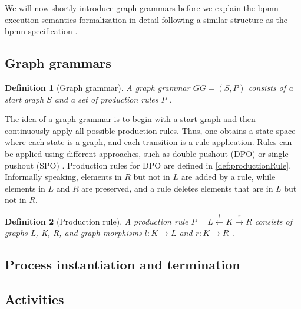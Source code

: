 \documentclass[adraft, copyright, creativecommons]{eptcs} %
\newtheorem{definition}{Definition}
\begin{document}
We will now shortly introduce graph grammars before we explain the \gls*{bpmn} execution semantics formalization in detail following a similar structure as the \gls*{bpmn} specification \cite[Chapter 13]{objectmanagementgroupBusinessProcessModel2013}.

\subsection{Graph grammars}

\begin{definition}[Graph grammar] \label{def:graphGrammar}
A graph grammar $GG=(S, P)$ consists of a start graph $S$ and a set of production rules $P$ \cite{ehrigFundamentalsAlgebraicGraph2006}. 
\end{definition}

The idea of a graph grammar is to begin with a start graph and then continuously apply all possible production rules.
Thus, one obtains a state space where each state is a graph, and each transition is a rule application.
Rules can be applied using different approaches, such as double-pushout (DPO) \cite{ehrigFundamentalsAlgebraicGraph2006} or single-pushout (SPO) \cite{loweAlgebraicApproachSinglepushout1993}.
Production rules for DPO are defined in \autoref{def:productionRule}.
Informally speaking, elements in $R$ but not in $L$ are added by a rule, while elements in $L$ and $R$ are preserved, and a rule deletes elements that are in $L$ but not in $R$.

\begin{definition}[Production rule] \label{def:productionRule}
A production rule $P= L \overset{l}{\leftarrow} K \overset{r}{\to} R$ consists of graphs L, K, R, and graph morphisms $l: K \to L$ and $r: K \to R$ \cite{ehrigFundamentalsAlgebraicGraph2006}.
\end{definition}




\subsection{Process instantiation and termination}

\subsection{Activities}
\end{document}
